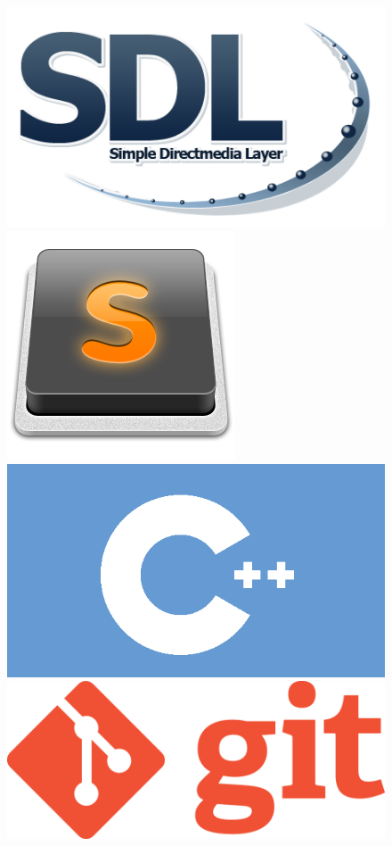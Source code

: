 \documentclass[11pt]{article} %
\begin{document}
\begin{figure}[!htp]
\begin{center}
  \includegraphics[scale=0.25]{res/Sdl-logo.png} \quad
  \includegraphics[scale=0.3]{res/Sublime_Text_Logo.png} \quad
  \includegraphics[scale=0.2]{res/cpp.png} \quad
  \includegraphics[scale=0.13]{res/git.png} \quad

\end{center}
\end{figure}
\end{document}
